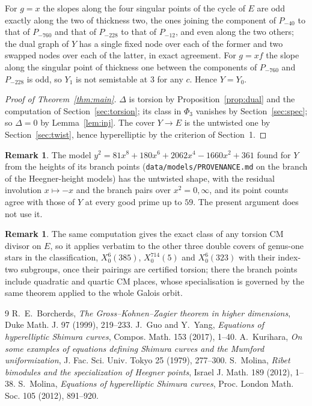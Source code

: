 \documentclass[11pt,reqno]{amsart}
\theoremstyle{plain}
\theoremstyle{definition}
\newtheorem{remark}[theorem]{Remark}
\begin{document}
For $g=x$ the slopes along the four singular points of the cycle of $E$ are odd exactly along the two
of thickness two, the ones joining the component of $P_{-40}$ to that of $P_{-760}$ and that of $P_{-228}$
to that of $P_{-12}$, and even along the two others; the dual graph of $Y$ has a single fixed node over
each of the former and two swapped nodes over each of the latter, in exact agreement. For $g=xf$ the
slope along the singular point of thickness one between the components of $P_{-760}$ and $P_{-228}$ is
odd, so $Y_1$ is not semistable at $3$ for any $c$. Hence $Y=Y_0$.

\begin{proof}[Proof of Theorem~\ref{thm:main}]
$\Delta$ is torsion by Proposition~\ref{prop:dual} and the computation of Section~\ref{sec:torsion}; its
class in $\Phi_3$ vanishes by Section~\ref{sec:spec}; so $\Delta=0$ by Lemma~\ref{lem:inj}. The cover
$Y\to E$ is the untwisted one by Section~\ref{sec:twist}, hence hyperelliptic by the criterion of
Section~1. \qedhere
\end{proof}

\begin{remark}
The model $y^2=81x^8+180x^6+2062x^4-1660x^2+361$ found for $Y$ from the heights of its branch points
(\texttt{data/models/PROVENANCE.md} on the branch of the Heegner-height models) has the untwisted shape,
with the residual involution $x\mapsto-x$ and the branch pairs over $x^2=0,\infty$, and its point counts
agree with those of $Y$ at every good prime up to $59$. The present argument does not use it.
\end{remark}

\begin{remark}
The same computation gives the exact class of any torsion CM divisor on $E$, so it applies verbatim to the
other three double covers of genus-one stars in the classification, $X_0^{6}(385)$, $X_0^{714}(5)$ and
$X_0^{6}(323)$ with their index-two subgroups, once their pairings are certified torsion; there the branch
points include quadratic and quartic CM places, whose specialisation is governed by the same theorem applied
to the whole Galois orbit.
\end{remark}

\begin{thebibliography}{9}
 R.~E.~Borcherds, \emph{The Gross--Kohnen--Zagier theorem in higher dimensions},
Duke Math. J. 97 (1999), 219--233.
 J.~Guo and Y.~Yang, \emph{Equations of hyperelliptic Shimura curves}, Compos. Math. 153
(2017), 1--40.
 A.~Kurihara, \emph{On some examples of equations defining Shimura curves and the Mumford
uniformization}, J. Fac. Sci. Univ. Tokyo 25 (1979), 277--300.
 S.~Molina, \emph{Ribet bimodules and the specialization of Heegner points}, Israel J. Math.
189 (2012), 1--38.
 S.~Molina, \emph{Equations of hyperelliptic Shimura curves}, Proc. London Math. Soc. 105
(2012), 891--920.
\end{thebibliography}
\end{document}
